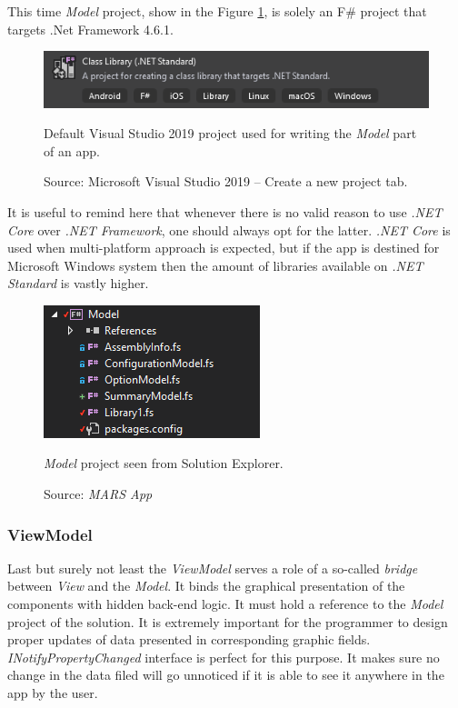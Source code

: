         This time \textit{Model} project, show in the Figure \ref{fig:model_VS19Project}, is solely an F\# project that targets .Net Framework 4.6.1.
        \begin{figure}[H]
            \centering
            \includegraphics{img/model_VS19Project.png}
            \caption{Default Visual Studio 2019 project used for writing the \textit{Model} part of an app.}
            \caption*{Source: Microsoft Visual Studio 2019 -- Create a new project tab.}
            \label{fig:model_VS19Project}
        \end{figure}
        
        It is useful to remind here that whenever there is no valid reason to use \textit{.NET Core} over \textit{.NET Framework}, one should always opt for the latter. \textit{.NET Core} is used when multi-platform approach is expected, but if the app is destined for Microsoft Windows system then the amount of libraries available on \textit{.NET Standard} is vastly higher.
        
        \begin{figure}[H]
            \centering
            \includegraphics{img/model.png}
            \caption{\textit{Model} project seen from Solution Explorer.}
            \caption*{Source: \textit{MARS App}}
            \label{fig:model}
        \end{figure} 
        
    \subsubsection{ViewModel}    
        Last but surely not least the \textit{ViewModel} serves a role of a so-called \textit{bridge} between \textit{View} and the \textit{Model}. It binds the graphical presentation of the components with hidden back-end logic. It must hold a reference to the \textit{Model} project of the solution. It is extremely important for the programmer to design proper updates of data presented in corresponding graphic fields. \textit{INotifyPropertyChanged} interface is perfect for this purpose. It makes sure no change in the data filed will go unnoticed if it is able to see it anywhere in the app by the user.
        
